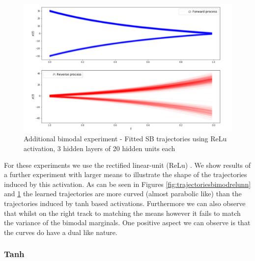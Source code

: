 \documentclass[a4paper,12pt,twoside,openright]{report}
\theoremstyle{definition}
\begin{document}
\begin{figure}
    \centering
    \includegraphics[scale=0.7,trim={0cm 0cm 0cm 0}, clip]{images/Control/almost_perfect_bimodal_relu.PNG}
    \caption{ Additional bimodal experiment - Fitted SB  trajectories using ReLu activation, 3 hidden layers of 20 hidden units each}
    \label{fig:trajectoriesbimodrelunn_}
\end{figure}

For these experiments we use the rectified linear-unit (ReLu) \citep{glorot2011deep}. We show results of a further experiment with larger means to illustrate the shape of the trajectories induced by this activation. As can be seen in Figures \ref{fig:trajectoriesbimodrelunn} and \ref{fig:trajectoriesbimodrelunn_} the learned trajectories are more curved (almost parabolic like) than the trajectories induced by tanh based activations. Furthermore we can also observe  that whilst on the right track to matching the means however it fails to match the variance of the bimodal marginals. One positive aspect we can observe is that the curves do have a dual like nature.

\subsubsection{Tanh}
\end{document}
